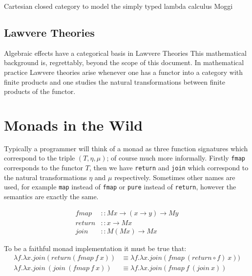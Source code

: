 \documentclass[a4paper,10pt]{article}
\theoremstyle{definition}
\begin{document}
Cartesian closed category to model the simply typed lambda calculus
Moggi


\subsection{Lawvere Theories}
Algebraic effects have a categorical basis in Lawvere Theories
This mathematical background is, regrettably, beyond the scope of this document.
In mathematical practice Lawvere theories arise whenever one has a functor into a category with finite products and one studies the natural transformations between finite products of the functor.
\cite{hyland2007category}

\section{Monads in the Wild}
Typically a programmer will think of a monad as three function signatures
which correspond to the triple $(T,\eta,\mu)$;
of course much more informally.
Firstly \texttt{fmap} corresponds to the functor $T$,
then we have \texttt{return} and \texttt{join} which correspond to
the natural transformations $\eta$ and $\mu$ respectively.
Sometimes other names are used,
for example \texttt{map} instead of \texttt{fmap}
or \texttt{pure} instead of \texttt{return},
however the semantics are exactly the same.

\begin{equation}
  \begin{split}
    fmap   &:: M x \rightarrow (x \rightarrow y) \rightarrow M y \\
    return &:: x \rightarrow M x                                 \\
    join   &:: M (M x) \rightarrow M x
  \end{split}
\end{equation}

To be a faithful monad implementation it must be true that:
\begin{equation}
  \begin{split}
      \lambda f.\lambda x.join(return (fmap\ f\ x))
      &\equiv
      \lambda f.\lambda x.join(fmap\ (return \circ f)\ x))
      \\
      \lambda f.\lambda x.join\ (join\ (fmap\ f\ x))
      &\equiv
      \lambda f.\lambda x.join(fmap\ f\ (join\ x))
  \end{split}
\end{equation}
\end{document}
